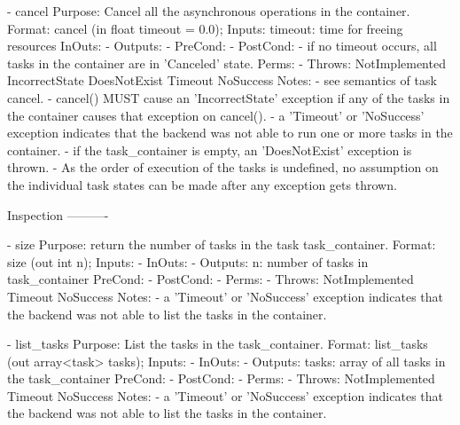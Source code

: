 \begin{myspec}
 
    - cancel
      Purpose:  Cancel all the asynchronous operations in the
                container.
      Format:   cancel               (in  float  timeout = 0.0);
      Inputs:   timeout:              time for freeing resources
      InOuts:   -
      Outputs:  -
      PreCond:  -
      PostCond: - if no timeout occurs, all tasks in the 
                  container are in 'Canceled' state.
      Perms:    -
      Throws:   NotImplemented
                IncorrectState
                DoesNotExist
                Timeout
                NoSuccess
      Notes:    - see semantics of task cancel.
                - cancel() MUST cause an 'IncorrectState' 
                  exception if any of the tasks in the container
                  causes that exception on cancel().
                - a 'Timeout' or 'NoSuccess' exception indicates
                  that the backend was not able to run one or
                  more tasks in the container.
                - if the task_container is empty, an
                  'DoesNotExist' exception is thrown.
                - As the order of execution of the tasks is
                  undefined, no assumption on the individual
                  task states can be made after any
                  exception gets thrown.
 
 
    Inspection
    ----------
 
    - size
      Purpose:  return the number of tasks in the task 
                task_container.
      Format:   size                 (out int  n);
      Inputs:   -
      InOuts:   -
      Outputs:  n:                    number of tasks in 
                                      task_container
      PreCond:  -
      PostCond: -
      Perms:    -
      Throws:   NotImplemented
                Timeout
                NoSuccess
      Notes:    - a 'Timeout' or 'NoSuccess' exception indicates
                  that the backend was not able to list the
                  tasks in the container.
 
 
    - list_tasks
      Purpose:  List the tasks in the task_container.
      Format:   list_tasks           (out array<task>   tasks);
      Inputs:   -
      InOuts:   -
      Outputs:  tasks:                array of all tasks in 
                                      the task_container
      PreCond:  -
      PostCond: -
      Perms:    -
      Throws:   NotImplemented
                Timeout
                NoSuccess
      Notes:    - a 'Timeout' or 'NoSuccess' exception indicates
                  that the backend was not able to list the
                  tasks in the container.
 

\end{myspec}

